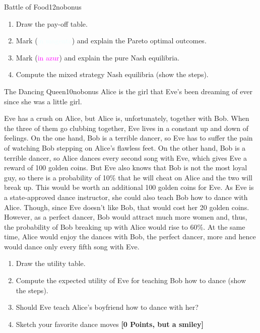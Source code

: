 \documentclass[twoside,english,colorbacktitle,accentcolor=tud9c,10pt]{tudexercise}
\begin{document}
\begin{questions}
\begin{question}{Battle of Food}{12}{nobonus}
	\begin{enumerate}
		\item Draw the pay-off table.
		\item Mark (\textcolor{azure}{in magenta}) and explain the Pareto optimal outcomes.
		\item Mark (\textcolor{magenta}{in azur}) and explain the pure Nash equilibria.
		\item Compute the mixed strategy Nash equilibria (show the steps).
	\end{enumerate}
\end{question}

\begin{question}{The Dancing Queen}{10}{nobonus}
	\eighthnote Alice is the girl that Eve's been dreaming of ever since she was a little girl. \twonotes
	
	Eve has a crush on Alice, but Alice is, unfortunately, together with Bob.
	When the three of them go clubbing together, Eve lives in a constant up and down of feelings.
	On the one hand, Bob is a terrible dancer, so Eve has to suffer the pain of watching Bob stepping on Alice's flawless feet. 
	On the other hand, Bob is a terrible dancer, so Alice dances every second song with Eve, which gives Eve a reward of 100 golden coins.
	But Eve also knows that Bob is not the most loyal guy, so there is a probability of 10\% that he will cheat on Alice and the two will break up.
	This would be worth an additional 100 golden coins for Eve.
	As Eve is a state-approved dance instructor, she could also teach Bob how to dance with Alice.
	Though, since Eve doesn't like Bob, that would cost her 20 golden coins.
	However, as a perfect dancer, Bob would attract much more women and, thus, the probability of Bob breaking up with Alice would rise to 60\%.
	At the same time, Alice would enjoy the dances with Bob, the perfect dancer, more and hence would dance only every fifth song with Eve.

	\begin{enumerate}
		\item Draw the utility table.
		\item Compute the expected utility of Eve for teaching Bob how to dance (show the steps).
		\item Should Eve teach Alice's boyfriend how to dance with her?
		\item Sketch your favorite dance moves \textbf{[0 Points, but a smiley]}
	\end{enumerate}
\end{question}

\end{questions}
\end{document}
